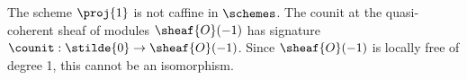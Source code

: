 \begin{example}
The scheme $\proj{1}$ is not caffine in $\schemes$.
The counit at the quasi-coherent sheaf of modules $\sheaf{O}(-1)$
has signature $\counit:\stilde{0} \rightarrow \sheaf{O}(-1)$.
Since $\sheaf{O}(-1)$ is locally free of degree 1, this cannot be an isomorphism.
\end{example}